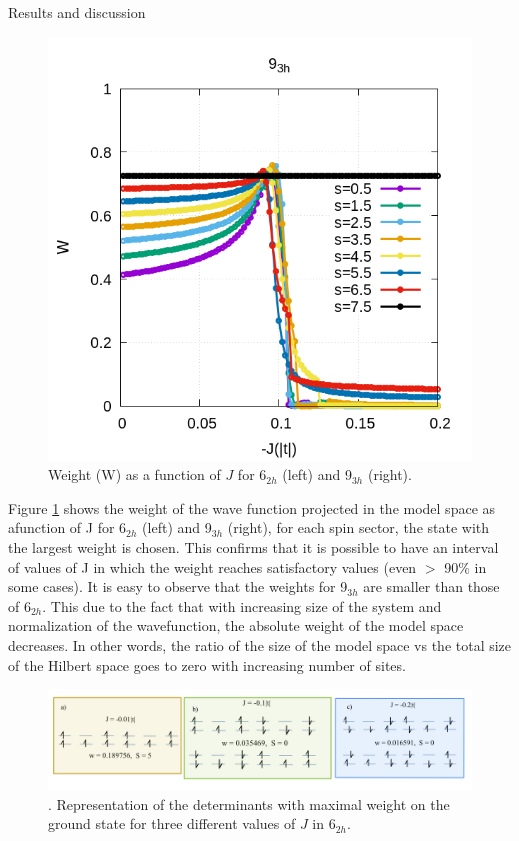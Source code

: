 \documentclass[12pt,twoside]{report}
\begin{document}
\begin{chapter}{Results and discussion}
\begin{figure}[ht]
\begin{minipage}{0.4\textwidth}
			\includegraphics[scale=0.3]{W_vs_J_sites_3-xrep-0.png}
		\end{minipage}
		\caption{\label{fig_w69} Weight (W) as a function of $J$ for 6$_{2h}$ (left) and 9$_{3h}$ (right). }
	\end{figure}
	Figure \ref{fig_w69} shows the weight of the wave function projected in the
	model space as afunction of J for 6$_{2h}$ (left) and 9$_{3h}$ (right), for
	each spin sector, the state with the largest weight is chosen. This confirms
	that it is possible to have an interval of values of J in which the weight
	reaches satisfactory values (even $>$ 90$\%$ in some cases). It is easy to
	observe that the weights for 9$_{3h}$ are smaller than those of 6$_{2h}$.
	This due to the fact that with increasing size of the system and
	normalization of the wavefunction, the absolute weight of the model space
	decreases. In other words, the ratio of the size of the model space vs the
	total size of the Hilbert space goes to zero with increasing number of sites.
	
	\begin{figure}[h!]
		\centering
			\includegraphics[scale=0.22]{determinants.jpg}
		\caption{\label{determinants}. Representation of the determinants with maximal weight on the ground state for three different values of $J$ in 6$_{2h}$.}
	\end{figure}
	 

\end{chapter}
\end{document}
